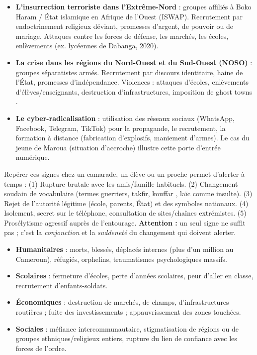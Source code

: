 \documentclass[11pt]{article}
\newcounter{popsec}
\newcounter{popsub}
\newcommand{\courssub}[1]{%
  \stepcounter{popsub}%
  \par\vspace{9pt}\noindent{\popxbold\fontsize{11.5}{13}\selectfont\color{popink}{\color{poporange}\thepopsec.\thepopsub}\hspace{6pt}#1}\par\nopagebreak\vspace{4pt}
}
\begin{document}
\begin{itemize}
\item \textbf{L'insurrection terroriste dans l'Extrême-Nord} : groupes affiliés à Boko Haram / État islamique en Afrique de l'Ouest (ISWAP). Recrutement par endoctrinement religieux déviant, promesses d'argent, de pouvoir ou de mariage. Attaques contre les forces de défense, les marchés, les écoles, enlèvements (ex. lycéennes de Dabanga, 2020).
\item \textbf{La crise dans les régions du Nord-Ouest et du Sud-Ouest (NOSO)} : groupes séparatistes armés. Recrutement par discours identitaire, haine de l'État, promesses d'indépendance. Violences : attaques d'écoles, enlèvements d'élèves/enseignants, destruction d'infrastructures, imposition de \og ghost towns \fg{}.
\item \textbf{Le cyber-radicalisation} : utilisation des réseaux sociaux (WhatsApp, Facebook, Telegram, TikTok) pour la propagande, le recrutement, la formation à distance (fabrication d'explosifs, maniement d'armes). Le cas du jeune de Maroua (situation d'accroche) illustre cette porte d'entrée numérique.
\end{itemize}

\begin{attention}
Repérer ces signes chez un camarade, un élève ou un proche permet d'alerter à temps : (1) Rupture brutale avec les amis/famille habituels. (2) Changement soudain de vocabulaire (termes guerriers, takfir, \og kouffar \fg{}, \og laïc \fg{} comme insulte). (3) Rejet de l'autorité légitime (école, parents, État) et des symboles nationaux. (4) Isolement, secret sur le téléphone, consultation de sites/chaînes extrémistes. (5) Prosélytisme agressif auprès de l'entourage. \textbf{Attention :} un seul signe ne suffit pas ; c'est la \emph{conjonction} et la \emph{suddeneté} du changement qui doivent alerter.
\end{attention}

\courssub{Conséquences de l'extrémisme violent}

\begin{itemize}
\item \textbf{Humanitaires} : morts, blessés, déplacés internes (plus d'un million au Cameroun), réfugiés, orphelins, traumatismes psychologiques massifs.
\item \textbf{Scolaires} : fermeture d'écoles, perte d'années scolaires, peur d'aller en classe, recrutement d'enfants-soldats.
\item \textbf{Économiques} : destruction de marchés, de champs, d'infrastructures routières ; fuite des investissements ; appauvrissement des zones touchées.
\item \textbf{Sociales} : méfiance intercommunautaire, stigmatisation de régions ou de groupes ethniques/religieux entiers, rupture du lien de confiance avec les forces de l'ordre.
\end{itemize}
\end{document}
